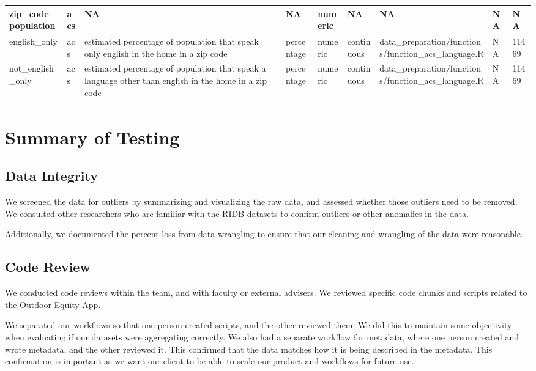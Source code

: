 \documentclass[
]{book}
\begin{document}
\begin{table}
\begin{tabular}[t]{l|l|l|l|l|l|l|l|l}
\hline
zip\_code\_population & acs & NA & NA & numeric & NA & NA & NA & NA\\
\hline
english\_only & acs & estimated percentage of population that speak only english in the home in a zip code & percentage & numeric & continuous & data\_preparation/functions/function\_acs\_language.R & NA & 11469\\
\hline
not\_english\_only & acs & estimated percentage of population that speak a language other than english in the home in a zip code & percentage & numeric & continuous & data\_preparation/functions/function\_acs\_language.R & NA & 11469\\
\hline
\end{tabular}
\end{table}

\hypertarget{summary-of-testing}{%
\chapter{Summary of Testing}\label{summary-of-testing}}

\hypertarget{data-integrity}{%
\section{Data Integrity}\label{data-integrity}}

We screened the data for outliers by summarizing and visualizing the raw data, and assessed whether those outliers need to be removed. We consulted other researchers who are familiar with the RIDB datasets to confirm outliers or other anomalies in the data.

Additionally, we documented the percent loss from data wrangling to ensure that our cleaning and wrangling of the data were reasonable.

\hypertarget{code-review}{%
\section{Code Review}\label{code-review}}

We conducted code reviews within the team, and with faculty or external advisers. We reviewed specific code chunks and scripts related to the Outdoor Equity App.

We separated our workflows so that one person created scripts, and the other reviewed them. We did this to maintain some objectivity when evaluating if our datasets were aggregating correctly. We also had a separate workflow for metadata, where one person created and wrote metadata, and the other reviewed it. This confirmed that the data matches how it is being described in the metadata. This confirmation is important as we want our client to be able to scale our product and workflows for future use.
\end{document}
